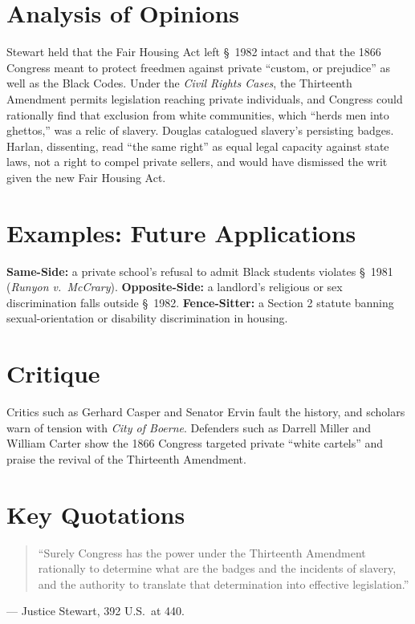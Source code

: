 \documentclass[12pt]{article}
\begin{document}
\section{Analysis of Opinions}
Stewart held that the Fair Housing Act left \S\ 1982 intact and that the 1866 Congress meant to protect freedmen against private ``custom, or prejudice'' as well as the Black Codes. Under the \textit{Civil Rights Cases}, the Thirteenth Amendment permits legislation reaching private individuals, and Congress could rationally find that exclusion from white communities, which ``herds men into ghettos,'' was a relic of slavery. Douglas catalogued slavery's persisting badges. Harlan, dissenting, read ``the same right'' as equal legal capacity against state laws, not a right to compel private sellers, and would have dismissed the writ given the new Fair Housing Act.

\section{Examples: Future Applications}
\textbf{Same-Side:} a private school's refusal to admit Black students violates \S\ 1981 (\textit{Runyon v.\ McCrary}). \textbf{Opposite-Side:} a landlord's religious or sex discrimination falls outside \S\ 1982. \textbf{Fence-Sitter:} a Section 2 statute banning sexual-orientation or disability discrimination in housing.

\section{Critique}
Critics such as Gerhard Casper and Senator Ervin fault the history, and scholars warn of tension with \textit{City of Boerne}. Defenders such as Darrell Miller and William Carter show the 1866 Congress targeted private ``white cartels'' and praise the revival of the Thirteenth Amendment.

\section{Key Quotations}
\begin{quote}
``Surely Congress has the power under the Thirteenth Amendment rationally to determine what are the badges and the incidents of slavery, and the authority to translate that determination into effective legislation.''
\end{quote}
\noindent --- Justice Stewart, 392 U.S.\ at 440.
\end{document}
